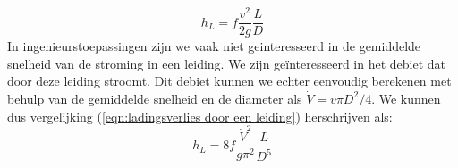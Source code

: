 \begin{equation}
	h_L = f \frac{v^2}{2 g} \frac{L}{D}
	\label{eqn:ladingsverlies door een leiding}
\end{equation}
In ingenieurstoepassingen zijn we vaak niet geinteresseerd in de gemiddelde snelheid van de stroming in een leiding. We zijn ge\"interesseerd in het debiet dat door deze leiding stroomt. Dit debiet kunnen we echter eenvoudig berekenen met behulp van de gemiddelde snelheid en de diameter als $\dot{V} = v \pi D^2/4$. We kunnen dus vergelijking (\ref{eqn:ladingsverlies door een leiding}) herschrijven als:
\begin{equation}
	h_L = 8 f \frac{\dot{V}^2}{g \pi^2} \frac{L}{D^5}
	\label{eqn:ladingsverlies door een leiding debiet}
\end{equation}

	\FloatBarrier
